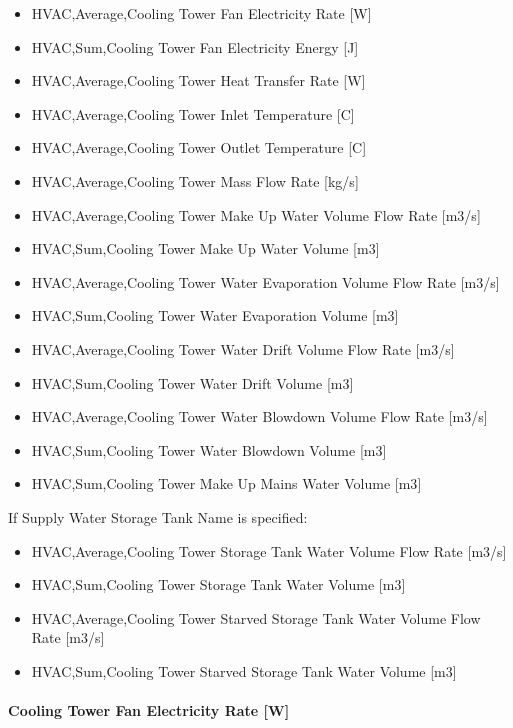 \begin{itemize}
\item
  HVAC,Average,Cooling Tower Fan Electricity Rate {[}W{]}
\item
  HVAC,Sum,Cooling Tower Fan Electricity Energy {[}J{]}
\item
  HVAC,Average,Cooling Tower Heat Transfer Rate {[}W{]}
\item
  HVAC,Average,Cooling Tower Inlet Temperature {[}C{]}
\item
  HVAC,Average,Cooling Tower Outlet Temperature {[}C{]}
\item
  HVAC,Average,Cooling Tower Mass Flow Rate {[}kg/s{]}
\item
  HVAC,Average,Cooling Tower Make Up Water Volume Flow Rate {[}m3/s{]}
\item
  HVAC,Sum,Cooling Tower Make Up Water Volume {[}m3{]}
\item
  HVAC,Average,Cooling Tower Water Evaporation Volume Flow Rate {[}m3/s{]}
\item
  HVAC,Sum,Cooling Tower Water Evaporation Volume {[}m3{]}
\item
  HVAC,Average,Cooling Tower Water Drift Volume Flow Rate {[}m3/s{]}
\item
  HVAC,Sum,Cooling Tower Water Drift Volume {[}m3{]}
\item
  HVAC,Average,Cooling Tower Water Blowdown Volume Flow Rate {[}m3/s{]}
\item
  HVAC,Sum,Cooling Tower Water Blowdown Volume {[}m3{]}
\item
  HVAC,Sum,Cooling Tower Make Up Mains Water Volume {[}m3{]}
\end{itemize}

If Supply Water Storage Tank Name is specified:

\begin{itemize}
\item
  HVAC,Average,Cooling Tower Storage Tank Water Volume Flow Rate {[}m3/s{]}
\item
  HVAC,Sum,Cooling Tower Storage Tank Water Volume {[}m3{]}
\item
  HVAC,Average,Cooling Tower Starved Storage Tank Water Volume Flow Rate {[}m3/s{]}
\item
  HVAC,Sum,Cooling Tower Starved Storage Tank Water Volume {[}m3{]}
\end{itemize}

\paragraph{Cooling Tower Fan Electricity Rate {[}W{]}}\label{cooling-tower-fan-electric-power-w-5}

